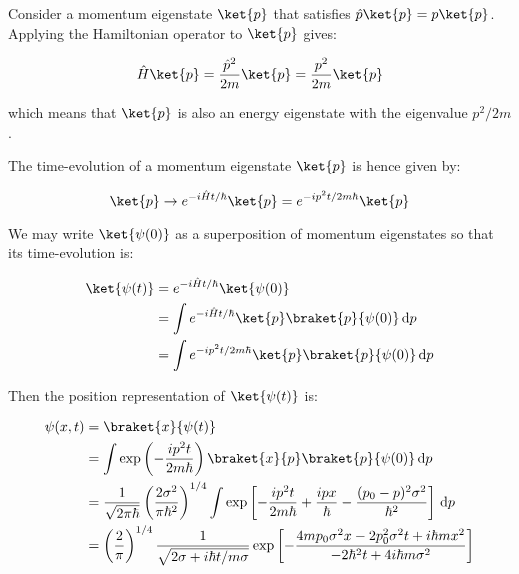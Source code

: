 \documentclass[12pt]{article}
\begin{document}
Consider a momentum eigenstate $\ket{p}$ that satisfies $\hat{p} \ket{p} = p \ket{p}$. Applying the Hamiltonian operator to $\ket{p}$ gives:

\begin{equation}
    \hat{H} \ket{p} = \frac{\hat{p}^{2}}{2m} \ket{p} = \frac{p^{2}}{2m} \ket{p}
\end{equation}

which means that $\ket{p}$ is also an energy eigenstate with the eigenvalue $p^{2}/2m$.

The time-evolution of a momentum eigenstate $\ket{p}$ is hence given by:

\begin{equation}
    \ket{p} \to e^{-i\hat{H}t/\hbar} \ket{p} = e^{-ip^{2}t/2m\hbar} \ket{p}
\end{equation}

We may write $\ket{\psi(0)}$ as a superposition of momentum eigenstates so that its time-evolution is:

\begin{equation}
    \begin{split}
        \ket{\psi(t)} &= e^{-i\hat{H}t/\hbar} \ket{\psi(0)} \\
        &= \int e^{-i\hat{H}t/\hbar} \ket{p} \braket{p}{\psi(0)} \, \mathrm{d}p \\
        &= \int e^{-ip^{2}t/2m\hbar} \ket{p} \braket{p}{\psi(0)} \, \mathrm{d}p
    \end{split}
\end{equation}

Then the position representation of $\ket{\psi(t)}$ is:

\begin{equation}
    \begin{split}
        \psi(x, t) &= \braket{x}{\psi(t)} \\
        &= \int \exp \left( -\frac{ip^{2}t}{2m\hbar} \right) \braket{x}{p} \braket{p}{\psi(0)} \, \mathrm{d}p  \\
        &= \frac{1}{\sqrt{2\pi\hbar}} \left( \frac{2\sigma^{2}}{\pi \hbar^{2}} \right)^{1/4} \int \exp \left[ -\frac{ip^{2}t}{2m\hbar} + \frac{ipx}{\hbar} - \frac{(p_{0} - p)^{2}\sigma^{2}}{\hbar^{2}} \right] \, \mathrm{d}p \\
        &= \left( \frac{2}{\pi} \right)^{1/4} \frac{1}{\sqrt{2\sigma + i\hbar t/m\sigma}} \exp \left[ -\frac{4mp_{0} \sigma^{2} x - 2p_{0}^{2} \sigma^{2} t + i\hbar mx^{2}}{-2\hbar^{2} t + 4i\hbar m \sigma^{2}} \right]
    \end{split}
\end{equation}
\end{document}
